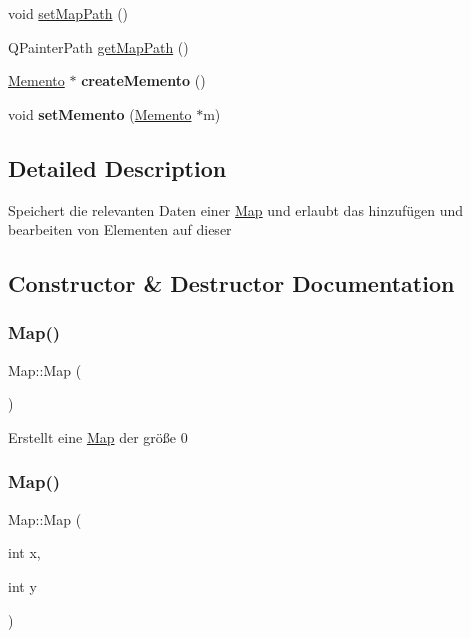 \begin{DoxyCompactItemize}
void \mbox{\hyperlink{class_map_a575b2a270c179acb59b5809b4fa1dfeb}{set\+Map\+Path}} ()
\item 
Q\+Painter\+Path \mbox{\hyperlink{class_map_ada28e2fd173999bcf7981d55de145d6d}{get\+Map\+Path}} ()
\item 
\mbox{\label{class_map_aa043caa073487984ab260266249fad44}} 
\mbox{\hyperlink{class_memento}{Memento}} $\ast$ {\bfseries create\+Memento} ()
\item 
\mbox{\label{class_map_aa8d2945eaaf81e9f12122c4a65b02e73}} 
void {\bfseries set\+Memento} (\mbox{\hyperlink{class_memento}{Memento}} $\ast$m)
\end{DoxyCompactItemize}


\subsection{Detailed Description}
Speichert die relevanten Daten einer \mbox{\hyperlink{class_map}{Map}} und erlaubt das hinzufügen und bearbeiten von Elementen auf dieser 

\subsection{Constructor \& Destructor Documentation}
\mbox{\label{class_map_a0f5ad0fd4563497b4214038cbca8b582}} 
\subsubsection{\texorpdfstring{Map()}{Map()}\hspace{0.1cm}{\footnotesize\ttfamily [1/2]}}
{\footnotesize\ttfamily Map\+::\+Map (\begin{DoxyParamCaption}{ }\end{DoxyParamCaption})}

Erstellt eine \mbox{\hyperlink{class_map}{Map}} der größe 0 \mbox{\label{class_map_a7dd574b3746a45123fd765945b6a2a7e}} 
\subsubsection{\texorpdfstring{Map()}{Map()}\hspace{0.1cm}{\footnotesize\ttfamily [2/2]}}
{\footnotesize\ttfamily Map\+::\+Map (\begin{DoxyParamCaption}\item[{int}]{x,  }\item[{int}]{y }\end{DoxyParamCaption})}


